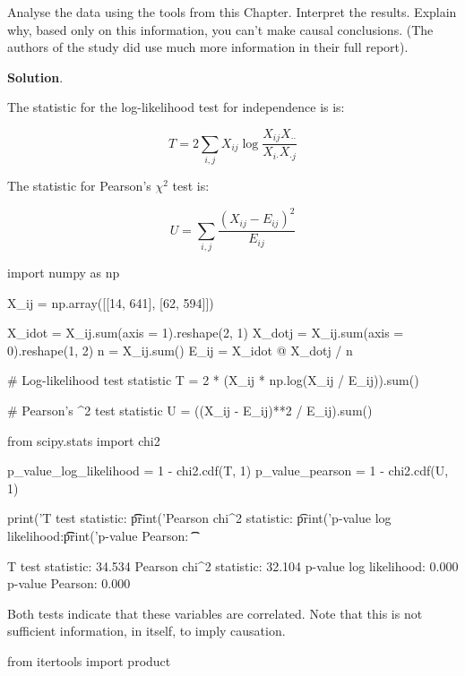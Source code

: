 {Analyse the data using the tools from this Chapter. Interpret the
results. Explain why, based only on this information, you can't make
causal conclusions. (The authors of the study did use much more
information in their full report).

\textbf{Solution}.

The statistic for the log-likelihood test for independence is is:

\[ T = 2 \sum_{i, j} X_{ij} \log \frac{X_{ij} X_{\text{··}}}{X_{i\text{·}} X_{\text{·}j}} \]

The statistic for Pearson's \(\chi^2\) test is:

\[ U = \sum_{i, j} \frac{(X_{ij} - E_{ij})^2}{E_{ij}}\]

\begin{python}
import numpy as np

X_ij = np.array([[14, 641], [62, 594]])
\end{python}

\begin{python}
X_idot = X_ij.sum(axis = 1).reshape(2, 1)
X_dotj = X_ij.sum(axis = 0).reshape(1, 2)
n = X_ij.sum()
E_ij = X_idot @ X_dotj / n

# Log-likelihood test statistic
T = 2 * (X_ij * np.log(X_ij / E_ij)).sum()

# Pearson's \chi^2 test statistic
U = ((X_ij - E_ij)**2 / E_ij).sum()
\end{python}

\begin{python}
from scipy.stats import chi2

p_value_log_likelihood = 1 - chi2.cdf(T, 1)
p_value_pearson = 1 - chi2.cdf(U, 1)

print('T test statistic: \t\t%
print('Pearson chi^2 statistic: \t%

print('p-value log likelihood:\t\t %
print('p-value Pearson: \t\t %
\end{python}

\begin{console}
T test statistic:               34.534
Pearson chi\^{}2 statistic:        32.104
p-value log likelihood:          0.000
p-value Pearson:                 0.000
\end{console}

Both tests indicate that these variables are correlated. Note that this
is not sufficient information, in itself, to imply causation.

\begin{python}
from itertools import product


\end{python}}
